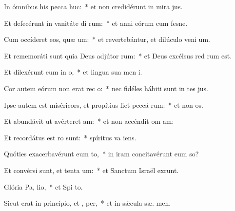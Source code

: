 \item In ómnibus his pecca huc:~* et non credidérunt in mira jus.
\item Et defecérunt in vanitáte di rum:~* et anni eórum cum fesne.
\item Cum occíderet eos, quæ um:~* et revertebántur, et dilúculo veni  um.
\item Et rememoráti sunt quia Deus adjútor  rum:~* et Deus excélsus red rum est.
\item Et dilexérunt eum in  o,~* et lingua sua men  i.
\item Cor autem eórum non erat rec  o:~* nec fidéles hábiti sunt in tes jus.
\item Ipse autem est miséricors, et propítius fiet peccá rum:~* et non  os.
\item Et abundávit ut avérteret  am:~* et non accéndit om  am:
\item Et recordátus est  ro sunt:~* spíritus va   iens.
\item Quóties exacerbavérunt eum  to,~* in iram concitavérunt eum  so?
\item Et convérsi sunt, et tenta um:~* et Sanctum Israël exrunt.
\item Glória Pa,  lio,~* et Spi to.
\item Sicut erat in princípio, et ,  per,~* et in sǽcula sæ. men.
